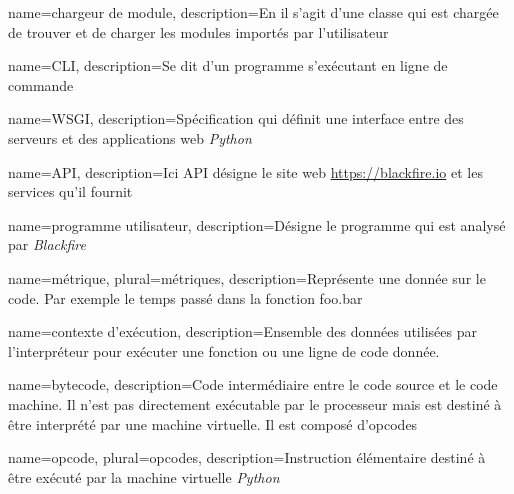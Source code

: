 {
  name=chargeur de module,
  description={En \Python il s'agit d'une classe qui est chargée de trouver et de charger les modules importés par l'utilisateur}
}

{
  name=CLI,
  description=Se dit d'un programme s'exécutant en ligne de commande
}

{
  name=WSGI,
  description=Spécification qui définit une interface entre des serveurs et des applications web \emph{Python}
}

{
  name=API,
  description=Ici API désigne le site web \url{https://blackfire.io} et les services qu'il fournit
}

{
  name=programme utilisateur,
  description=Désigne le programme qui est analysé par \emph{Blackfire}
}

{
  name=métrique,
  plural=métriques,
  description=Représente une donnée sur le code. Par exemple le temps passé dans la fonction foo.bar
}
 
{
  name=contexte d'exécution,
  description=Ensemble des données utilisées par l'interpréteur \Python pour exécuter une fonction ou une ligne de code donnée.
}
 
{
  name=bytecode,
  description=Code intermédiaire entre le code source et le code machine. Il n'est pas directement exécutable par le processeur mais est destiné à être interprété par une machine virtuelle. Il est composé d'opcodes
}
 
{
  name=opcode,
  plural=opcodes,
  description=Instruction élémentaire destiné à être exécuté par la machine virtuelle \emph{Python}
}